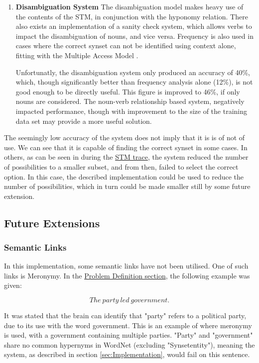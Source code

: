 \documentclass[]{article}
\begin{document}
\begin{enumerate}
	\item \textbf{Disambiguation System} \newline
		The disambiguation model makes heavy use of the contents of the STM, in conjunction with the hyponomy relation. There also exists an implementation of a sanity check system, which allows verbs to impact the disambiguation of nouns, and vice versa. Frequency is also used in cases where the correct synset can not be identified using context alone, fitting with the Multiple Access Model \cite{PsychologyOfLanguage}. 
		
		Unfortunatly, the disambiguation system only produced an accuracy of 40\%, which, though significantly better than frequency analysis alone (12\%), is not good enough to be directly useful. This figure is improved to 46\%, if only nouns are considered. The noun-verb relationship based system, negatively impacted performance, though with improvement to the size of the training data set may provide a more useful solution.
	

\end{enumerate}

The seemingly low accuracy of the system does not imply that it is is of not of use. We can see that it is capable of finding the correct synset in some cases. In others, as can be seen in during the \hyperref[sec:STMTrace]{STM trace}, the system reduced the number of possibilities to a smaller subset, and from then, failed to select the correct option. In this case, the described implementation could be used to reduce the number of possibilities, which in turn could be made smaller still by some future extension.


\subsection{Future Extensions}
\label{sec:ConcFuture}

\subsubsection{Semantic Links}
\label{sec:FutureSemantic}
In this implementation, some semantic links have not been utilised. One of such links is Meronymy. In the \hyperref[sec:ProbDef]{Problem Definition section}, the following example was given:

\[The\: party\: led\: government.\]

It was stated that the brain can identify that "party" refers to a political party, due to its use with the word government. This is an example of where meronymy is used, with a government containing multiple parties. "Party" and "government" share no common hypernyms in WordNet (excluding "Synset{entity}"), meaning the system, as described in section \ref{sec:Implementation}, would fail on this sentence. 
\end{document}
